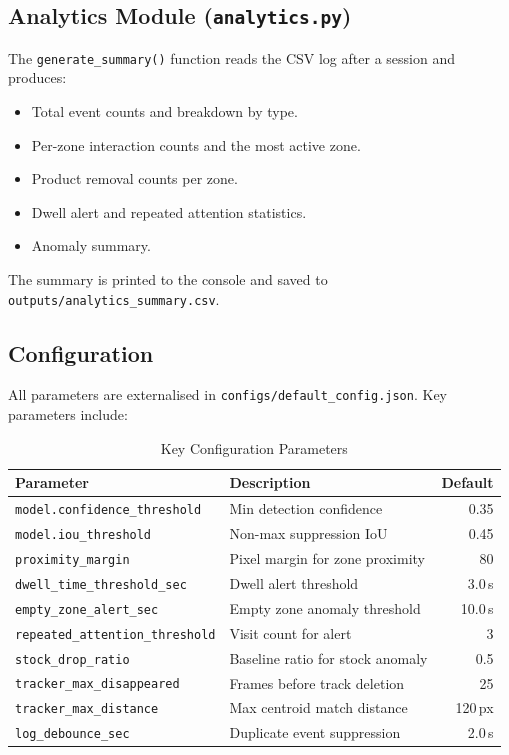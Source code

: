 \documentclass[12pt,a4paper]{article}
\begin{document}
\subsection{Analytics Module (\texttt{analytics.py})}

The \texttt{generate\_summary()} function reads the CSV log after a session and produces:
\begin{itemize}[nosep]
    \item Total event counts and breakdown by type.
    \item Per-zone interaction counts and the most active zone.
    \item Product removal counts per zone.
    \item Dwell alert and repeated attention statistics.
    \item Anomaly summary.
\end{itemize}

The summary is printed to the console and saved to \texttt{outputs/analytics\_summary.csv}.

\subsection{Configuration}

All parameters are externalised in \texttt{configs/default\_config.json}.
Key parameters include:

\begin{table}[h]
\centering
\caption{Key Configuration Parameters}
\begin{tabularx}{\textwidth}{lXr}
\toprule
\textbf{Parameter} & \textbf{Description} & \textbf{Default} \\
\midrule
\texttt{model.confidence\_threshold} & Min detection confidence & 0.35 \\
\texttt{model.iou\_threshold} & Non-max suppression IoU & 0.45 \\
\texttt{proximity\_margin} & Pixel margin for zone proximity & 80 \\
\texttt{dwell\_time\_threshold\_sec} & Dwell alert threshold & 3.0\,s \\
\texttt{empty\_zone\_alert\_sec} & Empty zone anomaly threshold & 10.0\,s \\
\texttt{repeated\_attention\_threshold} & Visit count for alert & 3 \\
\texttt{stock\_drop\_ratio} & Baseline ratio for stock anomaly & 0.5 \\
\texttt{tracker\_max\_disappeared} & Frames before track deletion & 25 \\
\texttt{tracker\_max\_distance} & Max centroid match distance & 120\,px \\
\texttt{log\_debounce\_sec} & Duplicate event suppression & 2.0\,s \\
\bottomrule
\end{tabularx}
\end{table}
\end{document}
